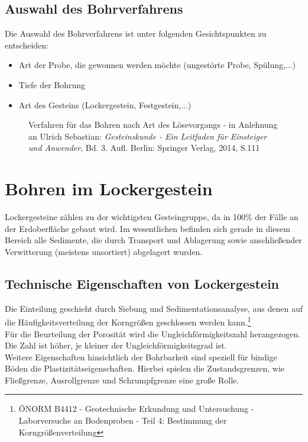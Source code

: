 \documentclass[12pt,a4paper,draft]{scrartcl} %
\begin{document}
\subsection{Auswahl des Bohrverfahrens}
Die Auswahl des Bohrverfahrens ist unter folgenden Gesichtspunkten zu entscheiden:

\begin{itemize}
\item Art der Probe, die gewonnen werden möchte (ungestörte Probe, Spülung,...)
\item Tiefe der Bohrung
\item Art des Gesteins (Lockergestein, Festgestein,...)
\end{itemize}

\begin{figure}[H]
\caption{Verfahren für das Bohren nach Art des Lösevorgangs - in Anlehnung an Ulrich Sebastian: \emph{Gesteinskunde - Ein Leitfaden für Einsteiger und Anwender}, Bd. 3. Aufl. Berlin: Springer Verlag, 2014, S.111}
\label{fig:Bohrverfahren_Lockergestein}
\end{figure}


\section{Bohren im Lockergestein}
Lockergesteine zählen zu der wichtigsten Gesteingruppe, da in 100\% der Fälle an der Erdoberfläche gebaut wird. Im wesentlichen befinden sich gerade in diesem Bereich alle Sedimente, die durch Transport und Ablagerung sowie anschließender Verwitterung (meistens unsortiert) abgelagert wurden.

\subsection{Technische Eigenschaften von Lockergestein}
Die Einteilung geschieht durch Siebung und Sedimentationsanalyse, aus denen auf die Häufigkeitsverteilung der Korngrößen geschlossen werden kann.\footnote{ÖNORM B4412 - Geotechnische Erkundung und Untersuchung - Laborversuche an Bodenproben - Teil 4: Bestimmung der Korngrößenverteilung}\\

Für die Beurteilung der Porosität wird die Ungleichförmigkeitszahl herangezogen. Die Zahl ist höher, je kleiner der Ungleichförmigkeitsgrad ist.\\

Weitere Eigenschaften hinsichtlich der Bohrbarkeit sind speziell für bindige Böden die Plastizitätseigenschaften. Hierbei spielen die Zustandsgrenzen, wie Fließgrenze, Ausrollgrenze und Schrumpfgrenze eine große Rolle.\\
\end{document}
